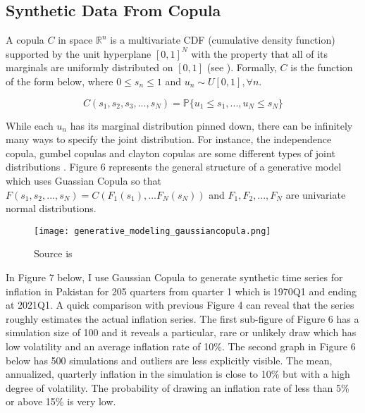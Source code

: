 \documentclass[12pt]{article}
\newcommand{\1}{\mathbbm 1}
\begin{document}
		
		
		\subsection{Synthetic Data From Copula}
		
		A copula $C$ in space $\mathbb{R}^{n}$ is a multivariate CDF (cumulative density function) supported by the unit hyperplane $[0,1]^{N}$ with the property that all of its marginals are uniformly distributed on $[0,1]$ (see \cite{stachurski2016primer}). Formally, $C$ is the function of the form below, where $0 \leq s_{n} \leq 1$ and $u_{n} \sim U[0, 1], \forall n$.
		
		\begin{equation}
			C(s_{1}, s_{2}, s_{3}, ... ,s_{N}) = \mathbb{P}\{u_{1} \leq s_{1}, ... , u_{N} \leq s_{N}\}
		\end{equation}
		
		While each $u_{n}$ has its marginal distribution pinned down, there can be infinitely many ways to specify the joint distribution. For instance, the independence copula, gumbel copulas and clayton copulas are some different types of joint distributions \cite{stachurski2016primer}. Figure 6 represents the general structure of a generative model which uses Guassian Copula so that $F(s_{1}, s_{2}, ..., s_{N}) = C(F_{1}(s_{1}), ... F_{N}(s_{N}))$ and $F_{1}, F_{2}, ... ,F_{N}$ are univariate normal distributions.
		
		
		
		
		
		
		
		
		
		
		
		
		
		
		
		
		
		\begin{figure}[H]
			\begin{Center}
				\texttt{[image: generative\_modeling\_gaussiancopula.png]}
				\caption{Source is  \cite{patki2016synthetic}}
			\end{Center}
		\end{figure}
		
		
		
		In Figure 7 below, I use Gaussian Copula to generate synthetic time series for inflation in Pakistan for 205 quarters from quarter 1 which is 1970Q1 and ending at 2021Q1. A quick comparison with previous Figure 4 can reveal that the series roughly estimates the actual inflation series. The first sub-figure of Figure 6 has a simulation size of 100 and it reveals a particular, rare or unlikely draw which has low volatility and an average inflation rate of 10\%. The second graph in Figure 6 below has 500 simulations and outliers are less explicitly visible. The mean, annualized, quarterly inflation in the simulation is close to 10\% but with a high degree of volatility. The probability of drawing an inflation rate of less than 5\% or above 15\% is very low.
		
\end{document}

